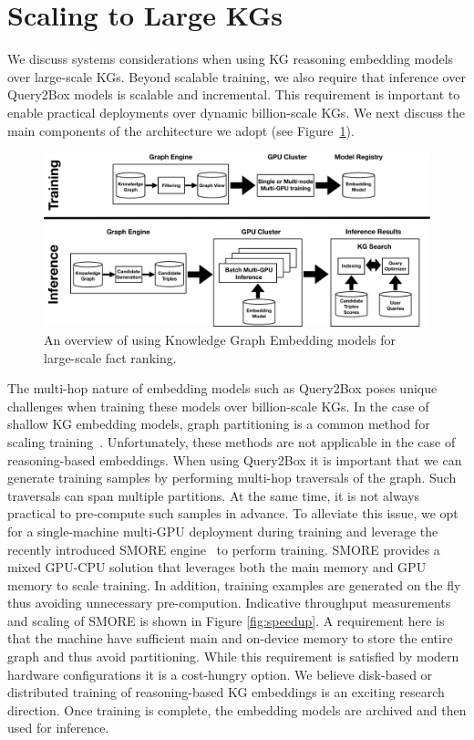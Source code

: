 \section{Scaling to Large KGs}\label{sec:ali_system}
We discuss systems considerations when using KG reasoning embedding models over large-scale KGs. Beyond scalable training, we also require that inference over Query2Box models is scalable and incremental. This requirement is important to enable practical deployments over dynamic billion-scale KGs. We next discuss the main components of the architecture we adopt (see Figure~\ref{fig:sys_overview}).

 \begin{figure}
        \centering
      \includegraphics[width=0.7\columnwidth]{submissions/Ali2023/figures/embedding_models_q2box_v2.pdf}
      \caption{An overview of using Knowledge Graph Embedding models for large-scale fact ranking.}
    \label{fig:sys_overview}
\end{figure}

The multi-hop nature of embedding models such as Query2Box poses unique challenges when training these models over billion-scale KGs. In the case of shallow KG embedding models, graph partitioning is a common method for scaling training~\cite{zhu2019graphvite, lerer2019pytorch}. Unfortunately, these methods are not applicable in the case of reasoning-based embeddings. When using Query2Box it is important that we can generate training samples by performing multi-hop traversals of the graph. Such traversals can span multiple partitions. At the same time, it is not always practical to pre-compute such samples in advance. To alleviate this issue, we opt for a single-machine multi-GPU deployment during training and leverage the recently introduced SMORE engine~\cite{ren2021smore} to perform training. SMORE provides a mixed GPU-CPU solution that leverages both the main memory and GPU memory to scale training. In addition, training examples are generated on the fly thus avoiding unnecessary pre-compution. Indicative throughput measurements and scaling of SMORE is shown in Figure \ref{fig:speedup}. A requirement here is that the machine have sufficient main and on-device memory to store the entire graph and thus avoid partitioning. While this requirement is satisfied by modern hardware configurations it is a cost-hungry option. We believe disk-based or distributed training of reasoning-based KG embeddings is an exciting research direction. Once training is complete, the embedding models are archived and then used for inference.

